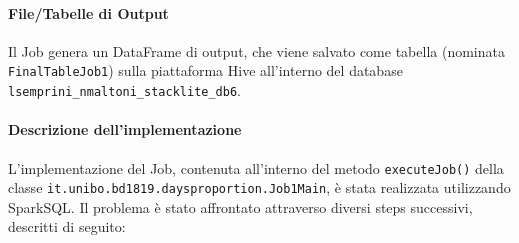   \paragraph{File/Tabelle di Output}\label{par:job1:spark:output}

  Il Job genera un DataFrame di output, che viene salvato come tabella (nominata \texttt{FinalTableJob1})
  sulla piattaforma Hive all'interno del database \texttt{lsemprini\_nmaltoni\_stacklite\_db6}.

  \paragraph{Descrizione dell'implementazione}\label{par:job1:spark:implementation}

  L'implementazione del Job, contenuta all'interno del metodo \texttt{executeJob()} della classe \texttt{it.unibo.bd1819.daysproportion.Job1Main}, %
  è stata realizzata utilizzando SparkSQL\@.
  Il problema è stato affrontato attraverso diversi steps successivi, descritti di seguito:

